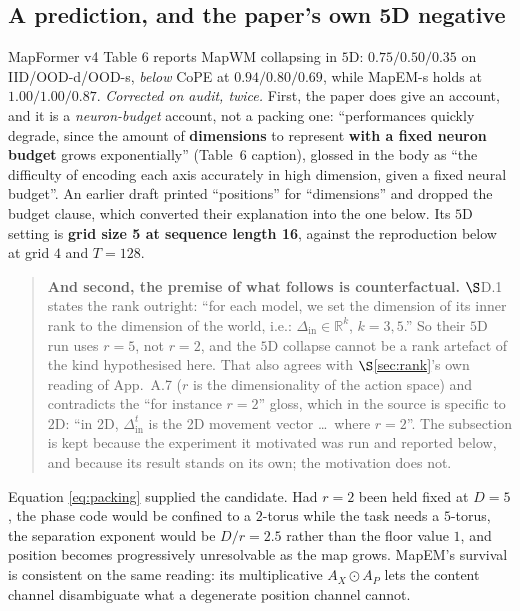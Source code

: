 \documentclass[11pt]{article}
\newcommand{\R}{\mathbb{R}}
\begin{document}
\subsection{A prediction, and the paper's own 5D negative}
\label{sec:predict}

MapFormer v4 Table 6 reports MapWM collapsing in $5$D: $0.75/0.50/0.35$ on
IID/OOD-d/OOD-s, \emph{below} CoPE at $0.94/0.80/0.69$, while MapEM-s holds at
$1.00/1.00/0.87$. \emph{Corrected on audit, twice.} First, the paper does give an account, and it is
a \emph{neuron-budget} account, not a packing one: ``performances quickly degrade,
since the amount of \textbf{dimensions} to represent \textbf{with a fixed neuron
budget} grows exponentially'' (Table~6 caption), glossed in the body as ``the
difficulty of encoding each axis accurately in high dimension, given a fixed neural
budget''. An earlier draft printed ``positions'' for ``dimensions'' and dropped the
budget clause, which converted their explanation into the one below. Its $5$D
setting is \textbf{grid size 5 at sequence length 16}, against the reproduction
below at grid $4$ and $T=128$.

\begin{quote}\small
\textbf{And second, the premise of what follows is counterfactual.} $\S$D.1 states
the rank outright: ``for each model, we set the dimension of its inner rank to the
dimension of the world, i.e.: $\Delta_{\mathrm{in}} \in \R^k$, $k = 3, 5$.'' So
their $5$D run uses $r=5$, not $r=2$, and the $5$D collapse cannot be a rank
artefact of the kind hypothesised here. That also agrees with $\S$\ref{sec:rank}'s
own reading of App.~A.7 ($r$ is the dimensionality of the action space) and
contradicts the ``for instance $r=2$'' gloss, which in the source is specific to
$2$D: ``in 2D, $\Delta_{\mathrm{in}}^t$ is the 2D movement vector \dots\ where
$r=2$''. The subsection is kept because the experiment it motivated was run and
reported below, and because its result stands on its own; the motivation does not.
\end{quote}

Equation \eqref{eq:packing} supplied the candidate. Had $r=2$ been held fixed at
$D=5$, the phase
code would be confined to a $2$-torus while the task needs a $5$-torus, the separation
exponent would be $D/r = 2.5$ rather than the floor value $1$, and position becomes
progressively unresolvable as the map grows. MapEM's survival is consistent on the
same reading: its multiplicative $A_X \odot A_P$ lets the content channel
disambiguate what a degenerate position channel cannot.
\end{document}
